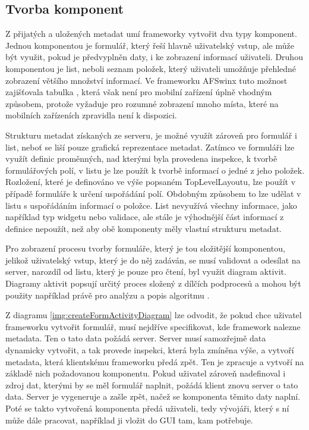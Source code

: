 \subsection{Tvorba komponent}
Z přijatých a uložených metadat umí frameworky vytvořit dva typy komponent. Jednou komponentou je formulář, který řeší hlavně uživatelský vstup, ale může být využit, pokud je předvyplněn daty, i ke zobrazení informací uživateli. Druhou komponentou je list, neboli seznam položek, který uživateli umožňuje přehledné zobrazení většího množství informací. Ve frameworku AFSwinx tuto možnost zajišťovala tabulka \cite{tomasek-thesis}, která však není pro mobilní zařízení úplně vhodným způsobem, protože vyžaduje pro rozumné zobrazení mnoho místa, které na mobilních zařízeních zpravidla není k dispozici.

Strukturu metadat získaných ze serveru, je možné využít zároveň pro formulář i list, neboť se liší pouze grafická reprezentace metadat. Zatímco ve formuláři lze využít definic proměnných, nad kterými byla provedena inspekce, k tvorbě formulářových polí, v listu je lze použít k tvorbě informací o jedné z jeho položek. Rozložení, které je definováno ve výše popsaném TopLevelLayoutu, lze použít v případě formuláře k určení uspořádání polí. Obdobným způsobem to lze udělat v listu s uspořádáním informací o položce. List nevyužívá všechny informace, jako například typ widgetu nebo validace, ale stále je výhodnější část informací z definice nepoužít, než aby obě komponenty měly vlastní strukturu metadat. 

Pro zobrazení procesu tvorby formuláře, který je tou složitější komponentou, jelikož uživatelský vstup, který je do něj zadáván, se musí validovat a odesílat na server, narozdíl od listu, který je pouze pro čtení, byl využit diagram aktivit. Diagramy aktivit popsují určitý proces složený z dílčích podprocesů a mohou být použity například právě pro analýzu a popis algoritmu \cite{UmlArlow}. 

Z diagramu \ref{img:createFormActivityDiagram} lze odvodit, že pokud chce uživatel frameworku vytvořit formulář, musí nejdříve specifikovat, kde framework nalezne metadata. Ten o tato data požádá server. Server musí samozřejmě data dynamicky vytvořit, a tak provede inspekci, která byla zmíněna výše, a vytvoří metadata, která klientskému frameworku předá zpět. Ten je zpracuje a vytvoří na základě nich požadovanou komponentu. Pokud uživatel zároveň nadefinoval i zdroj dat, kterými by se měl formulář naplnit, požádá klient znovu server o tato data. Server je vygeneruje a zašle zpět, načež se komponenta těmito daty naplní. Poté se takto vytvořená komponenta předá uživateli, tedy vývojáři, který s ní může dále pracovat, například ji vložit do GUI tam, kam potřebuje.

